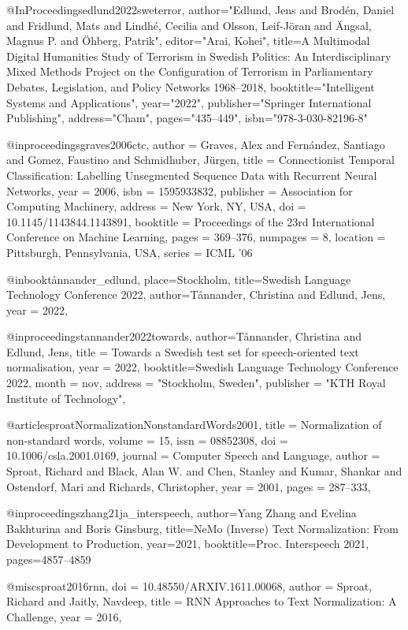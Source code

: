 @InProceedings{edlund2022sweterror,
author="Edlund, Jens
and Brod{\'e}n, Daniel
and Fridlund, Mats
and Lindh{\'e}, Cecilia
and Olsson, Leif-J{\"o}ran
and {\"A}ngsal, Magnus P.
and {\"O}hberg, Patrik",
editor="Arai, Kohei",
title={{A Multimodal Digital Humanities Study of Terrorism in Swedish Politics: An Interdisciplinary Mixed Methods Project on the Configuration of Terrorism in Parliamentary Debates, Legislation, and Policy Networks 1968--2018}},
booktitle="Intelligent Systems and Applications",
year="2022",
publisher="Springer International Publishing",
address="Cham",
pages="435--449",
isbn="978-3-030-82196-8"
}

@inproceedings{graves2006ctc,
author = {Graves, Alex and Fern\'{a}ndez, Santiago and Gomez, Faustino and Schmidhuber, J\"{u}rgen},
title = {Connectionist Temporal Classification: Labelling Unsegmented Sequence Data with Recurrent Neural Networks},
year = {2006},
isbn = {1595933832},
publisher = {Association for Computing Machinery},
address = {New York, NY, USA},
doi = {10.1145/1143844.1143891},
booktitle = {Proceedings of the 23rd International Conference on Machine Learning},
pages = {369–376},
numpages = {8},
location = {Pittsburgh, Pennsylvania, USA},
series = {ICML '06}
}

@inbook{tånnander_edlund,
place={Stockholm},
title={Swedish Language Technology Conference 2022},
author={Tånnander, Christina and Edlund, Jens},
year = {2022},
}

@inproceedings{tannander2022towards,
author={Tånnander, Christina and Edlund, Jens},
title = {{Towards a Swedish test set for speech-oriented text normalisation}},
year = {2022},
booktitle={Swedish Language Technology Conference 2022},
    month = nov,
    address = "Stockholm, Sweden",
    publisher = "KTH Royal Institute of Technology",
}

@article{sproatNormalizationNonstandardWords2001,
	title = {Normalization of non-standard words},
	volume = {15},
	issn = {08852308},
	doi = {10.1006/csla.2001.0169},
	journal = {Computer Speech and Language},
	author = {Sproat, Richard and Black, Alan W. and Chen, Stanley and Kumar, Shankar and Ostendorf, Mari and Richards, Christopher},
	year = {2001},
	pages = {287--333},
}

@inproceedings{zhang21ja_interspeech,
  author={Yang Zhang and Evelina Bakhturina and Boris Ginsburg},
  title={{NeMo (Inverse) Text Normalization: From Development to Production}},
  year=2021,
  booktitle={Proc. Interspeech 2021},
  pages={4857--4859}
}

@misc{sproat2016rnn,
  doi = {10.48550/ARXIV.1611.00068},
  author = {Sproat, Richard and Jaitly, Navdeep},
  title = {{RNN Approaches to Text Normalization: A Challenge}},
  year = {2016},
}

